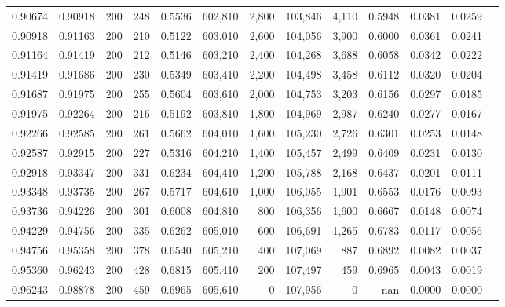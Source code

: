 \begin{tabular}{rrrrrrrrrrrrr}
0.90674 & 0.90918 &    200 & 248 &                                     0.5536 & 602,810 &   2,800 & 103,846 &   4,110 & 0.5948 & 0.0381 & 0.0259 \\
0.90918 & 0.91163 &    200 & 210 &                                     0.5122 & 603,010 &   2,600 & 104,056 &   3,900 & 0.6000 & 0.0361 & 0.0241 \\
0.91164 & 0.91419 &    200 & 212 &                                     0.5146 & 603,210 &   2,400 & 104,268 &   3,688 & 0.6058 & 0.0342 & 0.0222 \\
0.91419 & 0.91686 &    200 & 230 &                                     0.5349 & 603,410 &   2,200 & 104,498 &   3,458 & 0.6112 & 0.0320 & 0.0204 \\
0.91687 & 0.91975 &    200 & 255 &                                     0.5604 & 603,610 &   2,000 & 104,753 &   3,203 & 0.6156 & 0.0297 & 0.0185 \\
0.91975 & 0.92264 &    200 & 216 &                                     0.5192 & 603,810 &   1,800 & 104,969 &   2,987 & 0.6240 & 0.0277 & 0.0167 \\
0.92266 & 0.92585 &    200 & 261 &                                     0.5662 & 604,010 &   1,600 & 105,230 &   2,726 & 0.6301 & 0.0253 & 0.0148 \\
0.92587 & 0.92915 &    200 & 227 &                                     0.5316 & 604,210 &   1,400 & 105,457 &   2,499 & 0.6409 & 0.0231 & 0.0130 \\
0.92918 & 0.93347 &    200 & 331 &                                     0.6234 & 604,410 &   1,200 & 105,788 &   2,168 & 0.6437 & 0.0201 & 0.0111 \\
0.93348 & 0.93735 &    200 & 267 &                                     0.5717 & 604,610 &   1,000 & 106,055 &   1,901 & 0.6553 & 0.0176 & 0.0093 \\
0.93736 & 0.94226 &    200 & 301 &                                     0.6008 & 604,810 &     800 & 106,356 &   1,600 & 0.6667 & 0.0148 & 0.0074 \\
0.94229 & 0.94756 &    200 & 335 &                                     0.6262 & 605,010 &     600 & 106,691 &   1,265 & 0.6783 & 0.0117 & 0.0056 \\
0.94756 & 0.95358 &    200 & 378 &                                     0.6540 & 605,210 &     400 & 107,069 &     887 & 0.6892 & 0.0082 & 0.0037 \\
0.95360 & 0.96243 &    200 & 428 &                                     0.6815 & 605,410 &     200 & 107,497 &     459 & 0.6965 & 0.0043 & 0.0019 \\
0.96243 & 0.98878 &    200 & 459 &                                     0.6965 & 605,610 &       0 & 107,956 &       0 &    nan & 0.0000 & 0.0000 \\
\bottomrule
\end{tabular}
